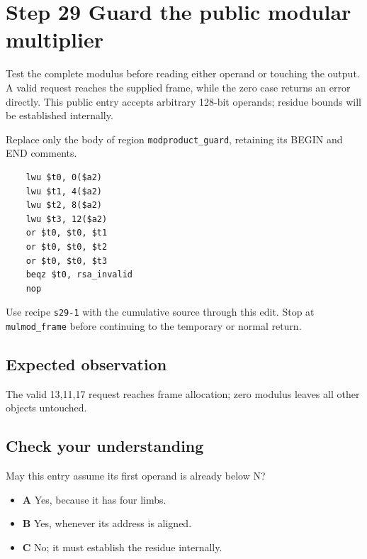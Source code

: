 \section{Step 29 Guard the public modular multiplier}\label{rsa-s29}

Test the complete modulus before reading either operand or touching the output. A valid request reaches the supplied frame, while the zero case returns an error directly. This public entry accepts arbitrary 128-bit operands; residue bounds will be established internally.

Replace only the body of region \texttt{modproduct\_guard}, retaining its BEGIN and END comments.

\begin{verbatim}
    lwu $t0, 0($a2)
    lwu $t1, 4($a2)
    lwu $t2, 8($a2)
    lwu $t3, 12($a2)
    or $t0, $t0, $t1
    or $t0, $t0, $t2
    or $t0, $t0, $t3
    beqz $t0, rsa_invalid
    nop
\end{verbatim}

Use recipe \texttt{s29-1} with the cumulative source through this edit. Stop at \texttt{mulmod\_frame} before continuing to the temporary or normal return.

\subsection{Expected observation}
The valid 13,11,17 request reaches frame allocation; zero modulus leaves all other objects untouched.

\subsection{Check your understanding}
May this entry assume its first operand is already below N?

\begin{itemize}
\item \textbf{A} Yes, because it has four limbs.
\item \textbf{B} Yes, whenever its address is aligned.
\item \textbf{C} No; it must establish the residue internally.
\end{itemize}
